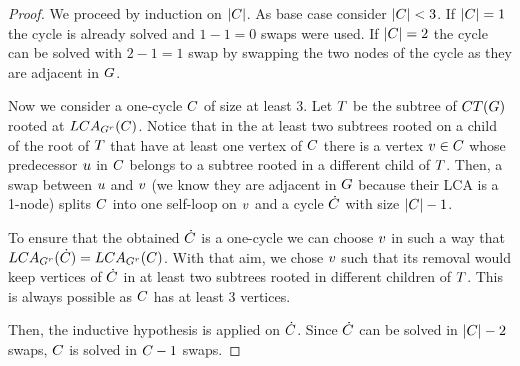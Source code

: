 \documentclass[msc,english,table,xcdraw]{ppgccufmg}
\begin{document}
\begin{proof}
We proceed by induction on $|C|$. As base case consider $|C| < 3$. If $|C| = 1$ the cycle is already solved and $1 - 1 = 0$ swaps were used. If $|C| = 2$ the cycle can be solved with $2 - 1 = 1$ swap by swapping the two nodes of the cycle as they are adjacent in $G$.

Now we consider a one-cycle $C$ of size at least 3. Let $T$ be the subtree of $CT(G)$ rooted at $LCA_{G^{r}}(C)$. %
Notice that in the at least two subtrees rooted on a child of the root of $T$ that have at least one vertex of $C$ there is a vertex $v \in C$ whose predecessor $u$ in $C$ belongs to a subtree rooted in a different child of $T$. Then, a swap between $u$ and $v$ (we know they are adjacent in $G$ because their LCA is a 1-node) splits $C$ into one self-loop on $v$ and a cycle $\dot{C}$ with size $|C| - 1$.

To ensure that the obtained $\dot{C}$ is a one-cycle we can choose $v$ in such a way that $LCA_{G^{r}}(\dot{C}) = LCA_{G^{r}}(C)$. With that aim, we chose $v$ such that its removal would keep vertices of $\dot{C}$ in at least two subtrees rooted in  different children of $T$. This is always possible as $C$ has at least 3 vertices.

Then, the inductive hypothesis is applied on $\dot{C}$. Since $\dot{C}$ can be solved in $|C| - 2$ swaps, $C$ is solved in $C - 1$ swaps.   


\end{proof}

\end{document}
